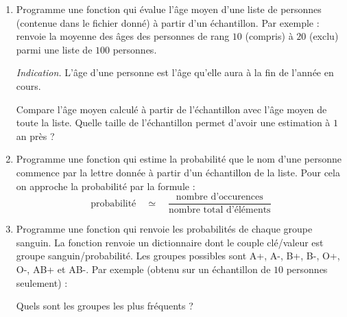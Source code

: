 \documentclass[11pt,class=report,crop=false]{standalone}
\begin{document}

\begin{activite}[Sondage]
	
		
\begin{enumerate}
	\item Programme une fonction  qui évalue l'âge moyen d'une liste de personnes (contenue dans le fichier donné)
	à partir d'un échantillon.
	Par exemple :
	renvoie la moyenne des âges des personnes de rang $10$ (compris) à $20$ (exclu) parmi une liste de $100$ personnes.
	
	\emph{Indication.} L'âge d'une personne est l'âge qu'elle aura à la fin de l'année en cours.
	
	Compare l'âge moyen calculé à partir de l'échantillon avec l'âge moyen de toute la liste. Quelle taille de l'échantillon permet d'avoir une estimation à $1$ an près ?
	
	\item Programme une fonction 
	qui estime la probabilité que le nom d'une personne commence par la lettre donnée à partir d'un échantillon de la liste.
	Pour cela on approche la probabilité par la formule :
	$$\text{probabilité} \quad \simeq \quad \frac{\text{nombre d'occurences}}{\text{nombre total d'éléments}}$$
	
	\item Programme une fonction  qui renvoie les probabilités de chaque groupe sanguin. La fonction renvoie un dictionnaire dont le couple \og{}clé/valeur\fg{} est \og{}groupe sanguin/probabilité\fg{}.
	Les groupes possibles sont A+, A-, B+, B-, O+, O-, AB+ et AB-.
	Par exemple (obtenu sur un échantillon de $10$ personnes seulement) :
	
	
	Quels sont les groupes les plus fréquents ?
	
\end{enumerate}
		
\end{activite}
\end{document}

